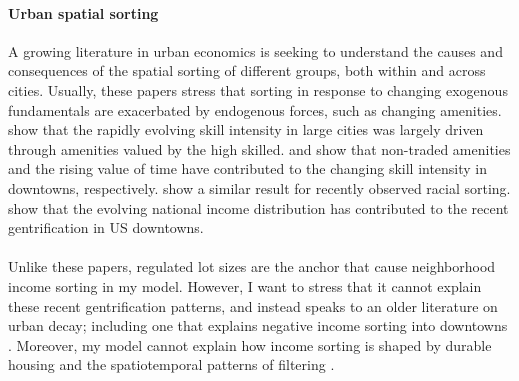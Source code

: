 \documentclass[]{article}
\begin{document}
\paragraph*{Urban spatial sorting} A growing literature in urban economics is seeking to understand the causes and consequences of the spatial sorting of different groups, both within and across cities. Usually, these papers stress that sorting in response to changing exogenous fundamentals are exacerbated by endogenous forces, such as changing amenities. \cite{diamond2016} show that the rapidly evolving skill intensity in large cities was largely driven through amenities valued by the high skilled. \cite{couturehandbury} and \cite{su2021} show that non-traded amenities and the rising value of time have contributed to the changing skill intensity in downtowns, respectively. \cite{bshartley2020} show a similar result for recently observed racial sorting. \cite{Coutureetal} show that the evolving national income distribution has contributed to the recent gentrification in US downtowns.

\paragraph*{}
Unlike these papers, regulated lot sizes are the anchor that cause neighborhood income sorting in my model. However, I want to stress that it cannot explain these recent gentrification patterns, and instead speaks to an older literature on urban decay; including one that explains negative income sorting into downtowns \citep{parispoor} \citep{ccpoortransport}. Moreover, my model cannot explain how income sorting is shaped by durable housing and the spatiotemporal patterns of filtering \citep{Gentrificationcycles}. 
\end{document}
